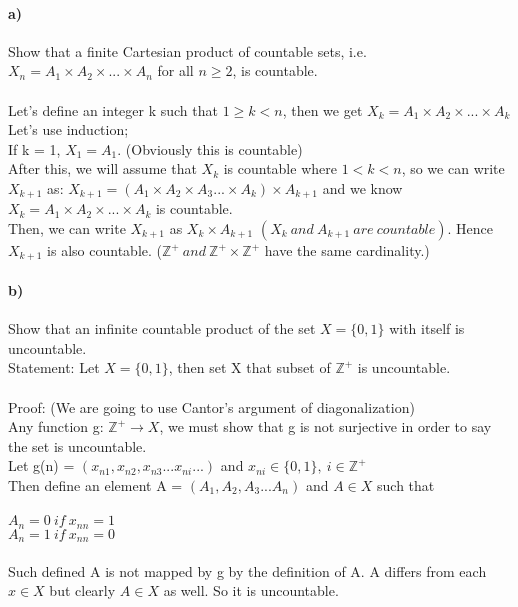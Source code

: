 \documentclass[12pt]{article}
\begin{document}
\paragraph{a)}
Show that a finite Cartesian product of countable sets, i.e. $X_n = A_1 \times A_2 \times . . . \times A_n$ for all $n \geq 2$, is countable.\\
\\
Let's define an integer k such that $1 \geq k < n$, then we get $X_k = A_1 \times A_2 \times . . . \times A_k$\\
Let's use induction;\\
If k = 1, $X_1 = A_1$. (Obviously this is countable)\\
After this, we will assume that $X_k$ is countable where $1 < k < n$, so we can write $X_{k+1}$ as: $X_{k+1} = (A_1 \times A_2 \times A_3 ... \times A_k) \times A_{k+1}$ and we know $X_k = A_1 \times A_2 \times . . . \times A_k$ is countable.\\ 
Then, we can write $X_{k+1}$ as $X_k \times A_{k+1}$ $(X_k\ and\ A_{k+1}\ are\ countable)$. Hence $X_{k+1}$ is also countable. ($\mathbb{Z^{+}}\ and\ \mathbb{Z^{+}}\times \mathbb{Z^{+}}$ have the same cardinality.) \\






\paragraph{b)}
Show that an infinite countable product of the set $X = \{0, 1\}$ with itself is uncountable.\\
Statement: Let $X = \{0, 1\}$, then set X that subset of $\mathbb{Z^{+}}$ is uncountable.\\
\\
Proof: (We are going to use Cantor's argument of diagonalization)\\
Any function g: $\mathbb{Z^{+}} \rightarrow X$, we must show that g is not surjective in order to say the set is uncountable.\\
Let g(n) = $(x_{n1}, x_{n2}, x_{n3}... x_{ni}...)$ and $x_{ni} \in \{0,1\},\ i \in \mathbb{Z^{+}}$\\
Then define an element A = $(A_1, A_2, A_3... A_n)$ and $A \in X$ such that\\
\\
$A_n = 0\ if \ x_{nn} = 1$\\
$A_n = 1\ if \ x_{nn} = 0$\\
\\
Such defined A is not mapped by g by the definition of A. A differs from each $x \in X$ but clearly $A \in X$ as well.
So it is uncountable.\\ 
\end{document}

